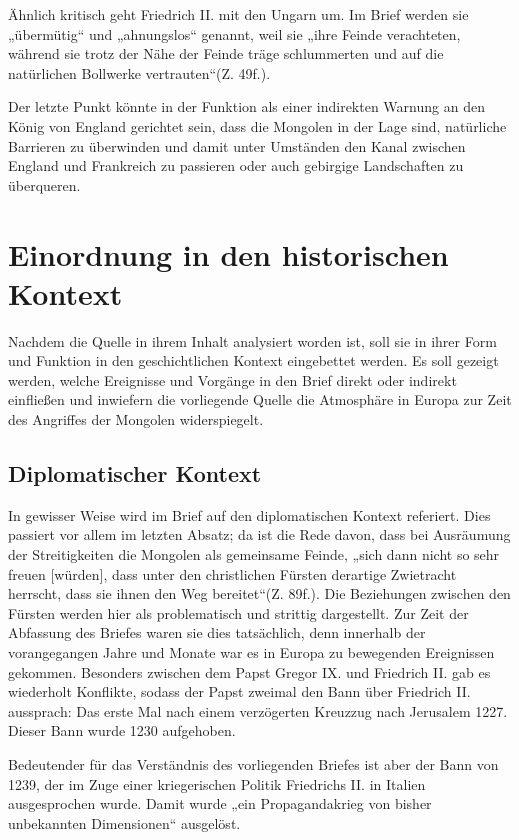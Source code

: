 \documentclass[12pt,headsepline,a4paper]{scrartcl}
\begin{document}
Ähnlich kritisch geht Friedrich II. mit den Ungarn um. Im Brief werden sie
„übermütig“ und „ahnungslos“ genannt, weil sie „ihre Feinde verachteten, während sie
trotz der Nähe der Feinde träge schlummerten und auf die natürlichen Bollwerke
vertrauten“(Z. 49f.).

Der letzte Punkt könnte in der Funktion als einer indirekten Warnung an den König
von England gerichtet sein, dass die Mongolen in der Lage sind, natürliche Barrieren zu
überwinden und damit unter Umständen den Kanal zwischen England und Frankreich
zu passieren oder auch gebirgige Landschaften zu überqueren.
\section{Einordnung in den historischen Kontext}
Nachdem die Quelle in ihrem Inhalt analysiert worden ist, soll sie in ihrer Form und
Funktion in den geschichtlichen Kontext eingebettet werden. Es soll gezeigt werden,
welche Ereignisse und Vorgänge in den Brief direkt oder indirekt einfließen und
inwiefern die vorliegende Quelle die Atmosphäre in Europa zur Zeit des Angriffes der
Mongolen widerspiegelt.
\subsection{Diplomatischer Kontext}
In gewisser Weise wird im Brief auf den diplomatischen Kontext referiert. Dies
passiert vor allem im letzten Absatz; da ist die Rede davon, dass bei Ausräumung der
Streitigkeiten die Mongolen als gemeinsame Feinde, „sich dann nicht so sehr freuen
[würden], dass unter den christlichen Fürsten derartige Zwietracht herrscht, dass sie
ihnen den Weg bereitet“(Z. 89f.). Die Beziehungen zwischen den Fürsten werden hier
als problematisch und strittig dargestellt. Zur Zeit der Abfassung des Briefes waren sie
dies tatsächlich, denn innerhalb der vorangegangen Jahre und Monate war es in Europa
zu bewegenden Ereignissen gekommen. Besonders zwischen dem Papst Gregor IX. und
Friedrich II. gab es wiederholt Konflikte, sodass der Papst zweimal den Bann über
Friedrich II. aussprach: Das erste Mal nach einem verzögerten Kreuzzug nach Jerusalem
1227. Dieser Bann wurde 1230 aufgehoben. 

Bedeutender für das Verständnis des
vorliegenden Briefes ist aber der Bann von 1239, der im Zuge einer kriegerischen
Politik
Friedrichs
II.
in
Italien
ausgesprochen
wurde.
Damit
wurde
„ein
Propagandakrieg von bisher unbekannten Dimensionen“\autocite[79]{beduerf2000} ausgelöst.
\end{document}

